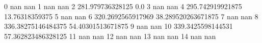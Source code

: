 0 nan nan
1 nan nan
2 281.979736328125 0.0
3 nan nan
4 295.742919921875 13.76318359375
5 nan nan
6 320.2692565917969 38.289520263671875
7 nan nan
8 336.38275146484375 54.40301513671875
9 nan nan
10 339.3425598144531 57.362823486328125
11 nan nan
12 nan nan
13 nan nan
14 nan nan
